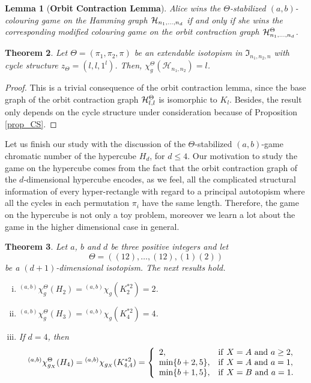 \documentclass{article}
\newtheorem{thm}{Theorem}
\newtheorem{lem}[thm]{Lemma}
\begin{document}
\begin{lem}[{\bf Orbit Contraction Lemma}]\label{orbitcontraction}
Alice wins the $\Theta$-stabilized $(a,b)$-colouring game on the Hamming graph ${\cal H}_{n_1,\ldots,n_d}$ if and only if she wins the corresponding modified colouring game on the orbit contraction graph ${\cal H}_{n_1,\ldots,n_d}^{\Theta}$.
\end{lem}

\vspace{0.1cm}

\begin{thm} Let $\Theta=(\pi_1,\pi_2,\pi)$ be an extendable isotopism in $\mathfrak{I}_{n_1,n_2,n}$ with cycle structure $z_{\Theta}=(l,l,1^l)$. Then, $\chi_g^{\Theta}(\mathcal{H}_{n_1,n_2})=l$.
\end{thm}

\begin{proof}
This is a trivial consequence of the orbit contraction lemma, since the base graph of the orbit contraction graph ${\cal H}_{l,l}^{\Theta}$ is isomorphic to $K_l$. Besides, the result only depends on the cycle structure under consideration because of Proposition \ref{prop_CS}.
\end{proof}

\vspace{0.2cm}

Let us finish our study with the discussion of the $\Theta$-stabilized $(a,b)$-game chromatic number of the hypercube $H_d$, for $d\leq 4$. Our motivation to study the game on the hypercube comes from the fact that the orbit contraction graph of the $d$-dimensional hypercube encodes, as we feel, all the complicated structural information of every hyper-rectangle with regard to a principal autotopism where all the cycles in each permutation $\pi_i$ have the same length. Therefore, the game on the hypercube is not only a toy problem, moreover we learn a lot about the game in the higher dimensional case in general.

\begin{thm} Let $a$, $b$ and $d$ be three positive integers and let 
\[\Theta=((12),\ldots,(12),(1)(2))\] 
be a $(d+1)$-dimensional isotopism. The next results hold.
\begin{enumerate}[i)]
\item ${}^{(a,b)}\chi_g^{\Theta}(H_2)={}^{(a,b)}\chi_g(K_2^{\ast2})=2$.
\item ${}^{(a,b)}\chi_g^{\Theta}(H_3)={}^{(a,b)}\chi_g(K_4^{\ast2})=4$.
\item If $d=4$, then
$${}^{(a,b)}\chi_{g_X}^{\Theta}(H_4)={}^{(a,b)}\chi_{g_X}(K_{4,4}^{\ast2})= \left\{\begin{array}{ll}
2,&{\rm if}\ X=A \text{ and } a\geq 2,\\
\min\{b+2,5\},&{\rm if}\ X=A \text{ and } a=1,\\
\min\{b+1,5\},&{\rm if}\ X=B \text{ and } a=1.
\end{array}\right.$$
\end{enumerate}
\end{thm}
\end{document}
